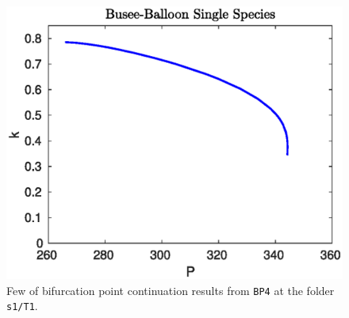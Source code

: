 \documentclass[a4paper,12pt]{article}
\begin{document}
\begin{figure}
    \centering
    \includegraphics[width=0.6\linewidth]{bussee_balloon.eps}
    \caption{Few of bifurcation point continuation results from {\tt BP4} at the folder {\tt s1/T1}.}
    \label{fig:busse_ball_ss}
\end{figure}



\\
\\
\\



\renewcommand{\baselinestretch}{0.9}
{\small   
% 
}
\end{document}

